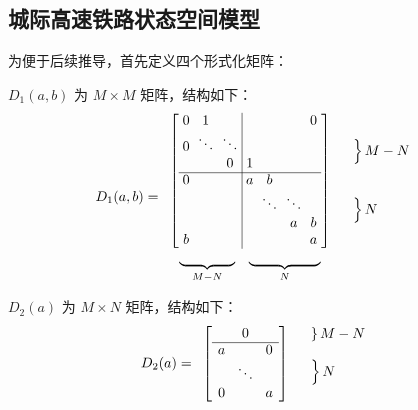 \subsection{城际高速铁路状态空间模型}
\label{2.C}

为便于后续推导，首先定义四个形式化矩阵：

$D_{1}(a,b)$ 为 $M \times M$ 矩阵，结构如下：
\begin{equation*}
	D_{1}(a,b)=
	\begin{array}{ccccccccc}
		\setlength{\arraycolsep}{1mm}
		\left[
		\begin{array}{ccc|cccc}
			0&1& & & & & 0\\
			0&\ddots&\ddots & & & & \\
			& &0&1& & & \\ 
			\cline{1-7}
			0& & &a&b& & \\
			& & & &\ddots&\ddots& \\
			& & & & & a&b\\
			b& & & & & &a\\
		\end{array}
		\right]
		& 
		\begin{array}{c}
			\left.\rule{0mm}{3.5mm}\right\}M-N  \\ \hfill
			\\
			\\
			\left.\rule{0mm}{3.5mm}\right\}N \hfill
			\\
		\end{array} \\
		\begin{array}{cc}
			\underbrace{\rule{14mm}{0mm}}_{M-N} &  
			\underbrace{\rule{18mm}{0mm}}_{N}
		\end{array}
	\end{array}
\end{equation*}

$D_{2}(a)$ 为 $M \times N$ 矩阵，结构如下：
\begin{equation*}
	D_{2}(a)=
	\begin{array}{cccccc}
		\setlength{\arraycolsep}{1.5mm}
		\left[
		\begin{array}{ccc}
			& 0&  \\
			\cline{1-3}
			a& &0\\ 
			&\ddots & \\
			0& &a\\
			
		\end{array}
		\right]
		&  
		\begin{array}{c}
			\left.\rule{0mm}{2mm}\right\}M-N \\ 
			\\
			\left.\rule{0mm}{4mm}\right\}N \hfill\\
			\\
		\end{array}
	\end{array}
\end{equation*}

